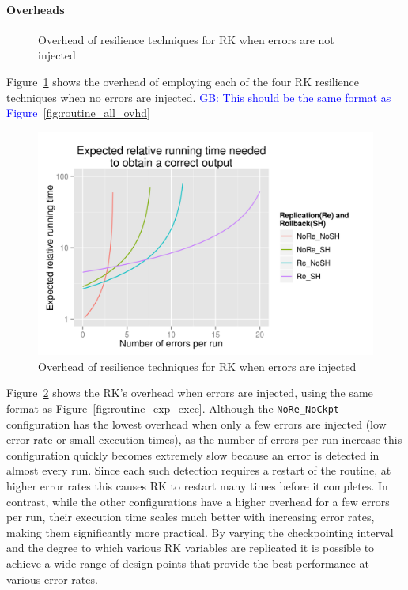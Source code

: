 \documentclass{sig-alternate}
\newcommand{\greg}[1]{%
  \textcolor{blue}{GB: #1}
}
\begin{document}
{\paragraph{Overheads}

\begin{figure}[ht!]
\centering
\caption{Overhead of resilience techniques for RK when errors are not injected}
\label{fig:rk_routine_detect_ovhd}
\end{figure}

Figure~\ref{fig:rk_routine_detect_ovhd} shows the overhead of employing each of the four RK resilience techniques when no errors are injected. \greg{This should be the same format as Figure~\ref{fig:routine_all_ovhd}}

\begin{figure}[ht!]
\centering
\includegraphics[width=1.00\columnwidth]{figs/4_1_2_Exp2_Expected_Running_Time_Needed.png}
\caption{Overhead of resilience techniques for RK when errors are injected}
\label{fig:rk_routine_exp_exec}
\end{figure}

Figure~\ref{fig:rk_routine_exp_exec} shows the RK's overhead when errors are injected, using the same format as Figure~\ref{fig:routine_exp_exec}.
Although the \texttt{NoRe\_NoCkpt} configuration has the lowest overhead when only a few errors are injected (low error rate or small execution times), as the number of errors per run increase this configuration quickly becomes extremely slow because an error is detected in almost every run.
Since each such detection requires a restart of the routine, at higher error rates this causes RK to restart many times before it completes.
In contrast, while the other configurations have a higher overhead for a few errors per run, their execution time scales much better with increasing error rates, making them significantly more practical.
By varying the checkpointing interval and the degree to which various RK variables are replicated it is possible to achieve a wide range of design points that provide the best performance at various error rates.

}
\end{document}

